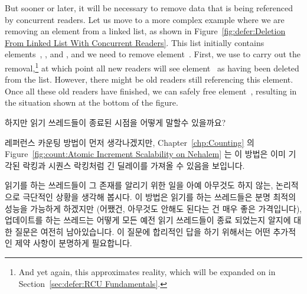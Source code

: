 But sooner or later, it will be necessary to remove data that is
being referenced by concurrent readers.
Let us move to a more complex example where we are removing an element
from a linked list, as shown in
Figure~\ref{fig:defer:Deletion From Linked List With Concurrent Readers}.
This list initially contains elements~, , and ,
and we need to remove element~.
First, we use  to carry out the removal,\footnote{
	And yet again, this approximates reality, which will be expanded
	on in Section~\ref{sec:defer:RCU Fundamentals}.}
at which point all new readers will see element~ as having been
deleted from the list.
However, there might be old readers still referencing this element.
Once all these old readers have finished, we can safely free
element~, resulting in the situation shown at the bottom of
the figure.
\fi

하지만 읽기 쓰레드들이 종료된 시점을 어떻게 말할수 있을까요?

레퍼런스 카운팅 방법이 먼저 생각나겠지만,
Chapter~\ref{chp:Counting} 의
Figure~\ref{fig:count:Atomic Increment Scalability on Nehalem}
는 이 방법은 이미 기각된 락킹과 시퀀스 락킹처럼 긴 딜레이를 가져올 수
있음을 보입니다.

읽기를 하는 쓰레드들이 그 존재를 알리기 위한 일을 아예 아무것도 하지 않는,
논리적으로 극단적인 상황을 생각해 봅시다.
이 방법은 읽기를 하는 쓰레드들은 분명 최적의 성능을 가능하게 하겠지만
(어쨌건, 아무것도 안해도 된다는 건 매우 좋은 가격입니다), 업데이트를 하는
쓰레드는 어떻게 모든 예전 읽기 쓰레드들이 종료 되었는지 알지에 대한 질문은
여전히 남아있습니다.
이 질문에 합리적인 답을 하기 위해서는 어떤 추가적인 제약 사항이 분명하게
필요합니다.

